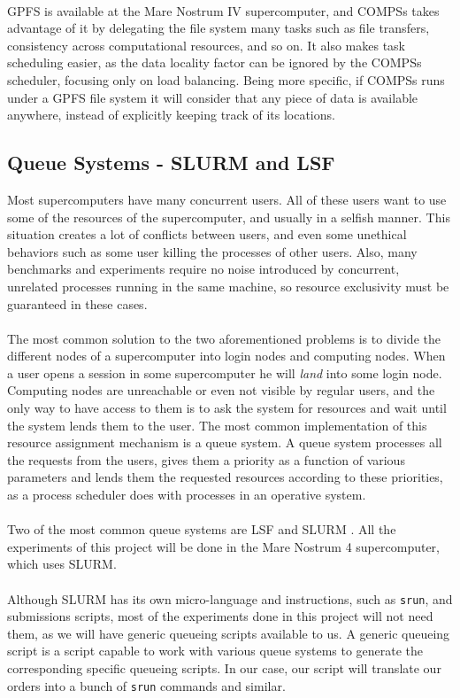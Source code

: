 \\
GPFS is available at the Mare Nostrum IV supercomputer, and COMPSs takes advantage of it by delegating the file system many tasks such as file transfers, consistency across computational resources, and so on. It also makes task scheduling easier, as the data locality factor can be ignored by the COMPSs scheduler, focusing only on load balancing. Being more specific, if COMPSs runs under a GPFS file system it will consider that any piece of data is available anywhere, instead of explicitly keeping track of its locations.

\subsection{Queue Systems - SLURM and LSF}
\label{subsec:hpc_queues}
Most supercomputers have many concurrent users. All of these users want to use some of the resources of the supercomputer, and usually in a selfish manner. This situation creates a lot of conflicts between users, and even some unethical behaviors such as some user killing the processes of other users. Also, many benchmarks and experiments require no noise introduced by concurrent, unrelated processes running in the same machine, so resource exclusivity must be guaranteed in these cases.\\
\\
The most common solution to the two aforementioned problems is to divide the different nodes of a supercomputer into login nodes and computing nodes. When a user opens a session in some supercomputer he will \textit{land} into some login node. Computing nodes are unreachable or even not visible by regular users, and the only way to have access to them is to ask the system for resources and wait until the system lends them to the user. The most common implementation of this resource assignment mechanism is a queue system. A queue system processes all the requests from the users, gives them a priority as a function of various parameters and lends them the requested resources according to these priorities, as a process scheduler does with processes in an operative system.\\
\\
Two of the most common queue systems are LSF \cite{zhou1992lsf} and SLURM \cite{yoo2003slurm}. All the experiments of this project will be done in the Mare Nostrum 4 supercomputer, which uses SLURM.\\
\\
Although SLURM has its own micro-language and instructions, such as \verb|srun|, and submissions scripts, most of the experiments done in this project will not need them, as we will have generic queueing scripts available to us. A generic queueing script is a script capable to work with various queue systems to generate the corresponding specific queueing scripts. In our case, our script will translate our orders into a bunch of \verb|srun| commands and similar.\\

